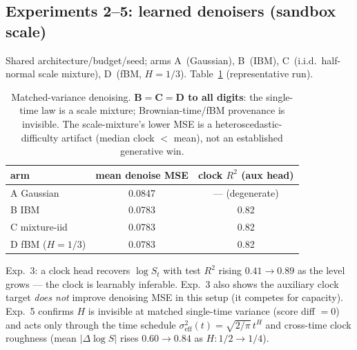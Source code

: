 \documentclass[11pt]{article}
\theoremstyle{definition}
\begin{document}
\subsection{Experiments 2--5: learned denoisers (sandbox scale)}
Shared architecture/budget/seed; arms A~(Gaussian), B~(IBM), C~(i.i.d.\ half-normal
scale mixture), D~(fBM, $H=1/3$). Table~\ref{tab:exp2} (representative run).
\begin{table}[h]\centering
\begin{tabular}{lcc}
\toprule
arm & mean denoise MSE & clock $R^2$ (aux head)\\
\midrule
A Gaussian      & 0.0847 & --- (degenerate)\\
B IBM           & 0.0783 & 0.82\\
C mixture-iid   & 0.0783 & 0.82\\
D fBM ($H=1/3$) & 0.0783 & 0.82\\
\bottomrule
\end{tabular}
\caption{Matched-variance denoising. \textbf{B$=$C$=$D to all digits}: the
single-time law is a scale mixture; Brownian-time/fBM provenance is invisible.
The scale-mixture's lower MSE is a heteroscedastic-difficulty artifact (median
clock $<$ mean), not an established generative win.}
\label{tab:exp2}
\end{table}

\noindent Exp.~3: a clock head recovers $\log S_t$ with test $R^2$ rising
$0.41\to0.89$ as the level grows --- the clock is learnably inferable. Exp.~3
also shows the auxiliary clock target \emph{does not} improve denoising MSE in
this setup (it competes for capacity). Exp.~5 confirms $H$ is invisible at
matched single-time variance (score diff $=0$) and acts only through the time
schedule $\sigma_{\mathrm{eff}}^2(t)=\sqrt{2/\pi}\,t^H$ and cross-time clock
roughness (mean $|\Delta\log S|$ rises $0.60\to0.84$ as $H\!:\!1/2\to1/4$).
\end{document}
